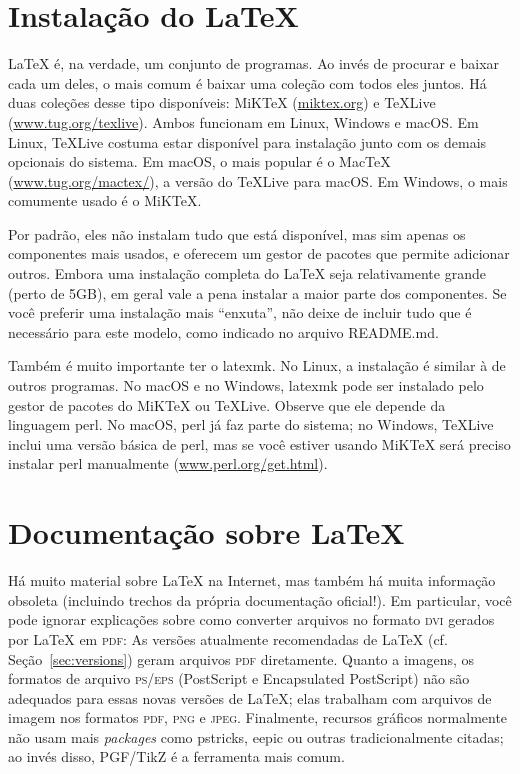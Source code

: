 \section{Instalação do \LaTeX{}}
\label{sec:install}

\LaTeX{} é, na verdade, um conjunto de programas. Ao invés de procurar e
baixar cada um deles, o mais comum é baixar uma coleção com todos eles juntos.
Há duas coleções desse tipo disponíveis: MiK\TeX{} (\url{miktex.org}) e
\TeX{}Live (\url{www.tug.org/texlive}). Ambos funcionam em Linux, Windows e
macOS. Em Linux, \TeX{}Live costuma estar disponível para instalação junto
com os demais opcionais do sistema. Em macOS, o mais popular é o Mac\TeX{}
(\url{www.tug.org/mactex/}), a versão do \TeX{}Live para macOS. Em Windows,
o mais comumente usado é o MiK\TeX{}.

Por padrão, eles não instalam tudo que está disponível, mas sim apenas os
componentes mais usados, e oferecem um gestor de pacotes que permite adicionar
outros. Embora uma instalação completa do \LaTeX{} seja relativamente grande
(perto de 5GB), em geral vale a pena instalar a maior parte dos componentes.
Se você preferir uma instalação mais ``enxuta'', não deixe de incluir tudo
que é necessário para este modelo, como indicado no arquivo README.md.

Também é muito importante ter o \textsf{latexmk}. No Linux, a instalação
é similar à de outros programas. No macOS e no Windows, \textsf{latexmk}
pode ser instalado pelo gestor de pacotes do MiK\TeX{} ou \TeX{}Live.
Observe que ele depende da linguagem \textsf{perl}. No macOS,
\textsf{perl} já faz parte do sistema; no Windows, \TeX{}Live inclui
uma versão básica de perl, mas se você estiver usando MiK\TeX{} será
preciso instalar \textsf{perl} manualmente (\url{www.perl.org/get.html}).

\section{Documentação sobre \LaTeX}
\label{sec:docs}

Há muito material sobre \LaTeX{} na Internet, mas também há muita informação
obsoleta (incluindo trechos da própria documentação oficial!). Em particular,
você pode ignorar explicações sobre como converter arquivos no formato
\textsc{dvi} gerados por \LaTeX{} em \textsc{pdf}: As versões atualmente
recomendadas de \LaTeX{} (cf. Seção~\ref{sec:versions}) geram arquivos
\textsc{pdf} diretamente. Quanto a imagens, os formatos de arquivo
\textsc{ps/eps} (PostScript e Encapsulated PostScript) não são adequados
para essas novas versões de \LaTeX{}; elas trabalham com arquivos de imagem
nos formatos \textsc{pdf}, \textsc{png} e \textsc{jpeg}. Finalmente,
recursos gráficos normalmente não usam mais \textit{packages} como
\textsf{pstricks}, \textsf{eepic} ou outras tradicionalmente citadas;
ao invés disso, \textsf{PGF/TikZ} é a ferramenta mais comum.

